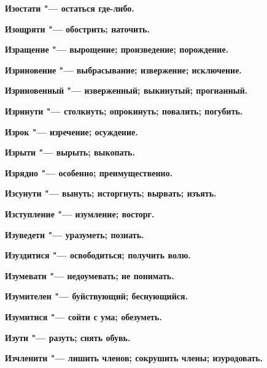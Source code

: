 \begin{multicols}{2}
\bfseries Изостати\normalfont{} "--- остаться где-либо. 




\bfseries Изощряти\normalfont{} "--- обострить; наточить. 




\bfseries Изращение\normalfont{} "--- вырощение; произведение; порождение. 




\bfseries Изриновение\normalfont{} "--- выбрасывание; извержение; исключение. 




\bfseries Изриновенный\normalfont{} "--- изверженный; выкинутый; прогнанный. 




\bfseries Изринути\normalfont{} "--- столкнуть; опрокинуть; повалить; погубить. 




\bfseries Изрок\normalfont{} "--- изречение; осуждение. 




\bfseries Изрыти\normalfont{} "--- вырыть; выкопать. 




\bfseries Изрядно\normalfont{} "--- особенно; преимущественно. 




\bfseries Изсунути\normalfont{} "--- вынуть; исторгнуть; вырвать; изъять. 




\bfseries Изступление\normalfont{} "--- изумление; восторг. 




\bfseries Изуведети\normalfont{} "--- уразуметь; познать. 




\bfseries Изуздитися\normalfont{} "--- освободиться; получить волю. 




\bfseries Изумевати\normalfont{} "--- недоумевать; не понимать. 




\bfseries Изумителен\normalfont{} "--- буйствующий; беснующийся. 




\bfseries Изумитися\normalfont{} "--- сойти с ума; обезуметь. 




\bfseries Изути\normalfont{} "--- разуть; снять обувь. 




\bfseries Изчленити\normalfont{} "--- лишить членов; сокрушить члены; изуродовать. 





\end{multicols}
